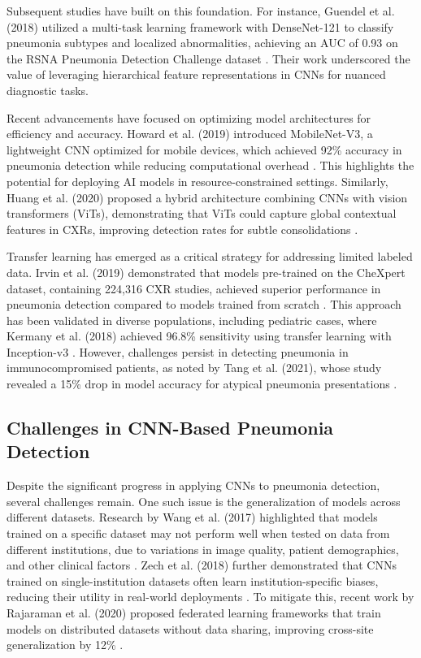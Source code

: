 \documentclass[
  twocolumn,
  10pt,
  a4paper,
  journal
]{IEEEtran}
\begin{document}
Subsequent studies have built on this foundation. For instance, Guendel et al. (2018) utilized a multi-task learning framework with DenseNet-121 to classify pneumonia subtypes and localized abnormalities, achieving an AUC of 0.93 on the RSNA Pneumonia Detection Challenge dataset \cite{guendel2018}. Their work underscored the value of leveraging hierarchical feature representations in CNNs for nuanced diagnostic tasks.

Recent advancements have focused on optimizing model architectures for efficiency and accuracy. Howard et al. (2019) introduced MobileNet-V3, a lightweight CNN optimized for mobile devices, which achieved 92\% accuracy in pneumonia detection while reducing computational overhead \cite{howard2019}. This highlights the potential for deploying AI models in resource-constrained settings. Similarly, Huang et al. (2020) proposed a hybrid architecture combining CNNs with vision transformers (ViTs), demonstrating that ViTs could capture global contextual features in CXRs, improving detection rates for subtle consolidations \cite{huang2020}.

Transfer learning has emerged as a critical strategy for addressing limited labeled data. Irvin et al. (2019) demonstrated that models pre-trained on the CheXpert dataset, containing 224,316 CXR studies, achieved superior performance in pneumonia detection compared to models trained from scratch \cite{irvin2019}. This approach has been validated in diverse populations, including pediatric cases, where Kermany et al. (2018) achieved 96.8\% sensitivity using transfer learning with Inception-v3 \cite{kermany2018}. However, challenges persist in detecting pneumonia in immunocompromised patients, as noted by Tang et al. (2021), whose study revealed a 15\% drop in model accuracy for atypical pneumonia presentations \cite{tang2021}.

\subsection{Challenges in CNN-Based Pneumonia Detection}

Despite the significant progress in applying CNNs to pneumonia detection, several challenges remain. One such issue is the generalization of models across different datasets. Research by Wang et al. (2017) highlighted that models trained on a specific dataset may not perform well when tested on data from different institutions, due to variations in image quality, patient demographics, and other clinical factors \cite{wang2017}. Zech et al. (2018) further demonstrated that CNNs trained on single-institution datasets often learn institution-specific biases, reducing their utility in real-world deployments \cite{zech2018}. To mitigate this, recent work by Rajaraman et al. (2020) proposed federated learning frameworks that train models on distributed datasets without data sharing, improving cross-site generalization by 12\% \cite{rajaraman2020}.
\end{document}
